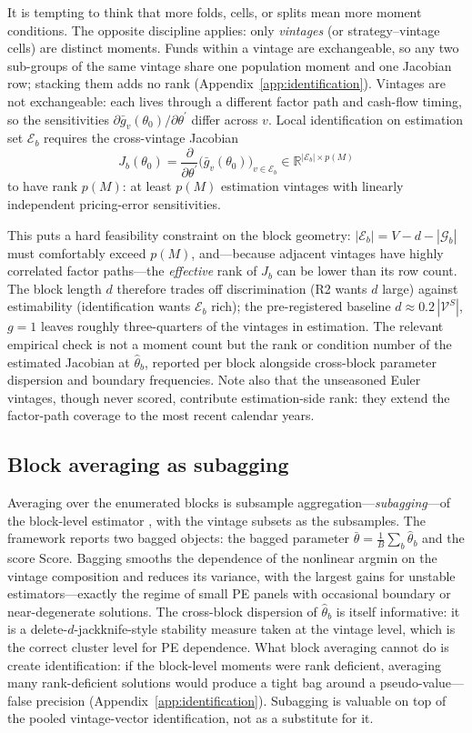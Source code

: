 \documentclass[11pt]{article}
\begin{document}
It is tempting to think that more folds, cells, or splits mean more moment conditions. The opposite discipline applies: only \emph{vintages} (or strategy--vintage cells) are distinct moments. Funds within a vintage are exchangeable, so any two sub-groups of the same vintage share one population moment and one Jacobian row; stacking them adds no rank (Appendix~\ref{app:identification}). Vintages are not exchangeable: each lives through a different factor path and cash-flow timing, so the sensitivities \(\partial\bar g_v(\theta_0)/\partial\theta^\prime\) differ across \(v\). Local identification on estimation set \(\mathcal E_b\) requires the cross-vintage Jacobian
\[
J_b(\theta_0)=\frac{\partial}{\partial\theta^\prime}\bigl(\bar g_{v}(\theta_0)\bigr)_{v\in\mathcal E_b}\in\mathbb R^{|\mathcal E_b|\times p(M)}
\]
to have rank \(p(M)\): at least \(p(M)\) estimation vintages with linearly independent pricing-error sensitivities.

This puts a hard feasibility constraint on the block geometry: \(|\mathcal E_b|=V-d-|\mathcal G_b|\) must comfortably exceed \(p(M)\), and---because adjacent vintages have highly correlated factor paths---the \emph{effective} rank of \(J_b\) can be lower than its row count. The block length \(d\) therefore trades off discrimination (R2 wants \(d\) large) against estimability (identification wants \(\mathcal E_b\) rich); the pre-registered baseline \(d\approx0.2\,|\mathcal V^S|\), \(g=1\) leaves roughly three-quarters of the vintages in estimation. The relevant empirical check is not a moment count but the rank or condition number of the estimated Jacobian at \(\hat\theta_b\), reported per block alongside cross-block parameter dispersion and boundary frequencies. Note also that the unseasoned Euler vintages, though never scored, contribute estimation-side rank: they extend the factor-path coverage to the most recent calendar years.

\subsection{Block averaging as subagging}
\label{sec:subagging}

Averaging over the enumerated blocks is subsample aggregation---\emph{subagging}---of the block-level estimator \citep{BuhlmannYu2002}, with the vintage subsets as the subsamples. The framework reports two bagged objects: the bagged parameter \(\bar\theta=\tfrac1B\sum_b\hat\theta_b\) and the score \(\mathrm{Score}\). Bagging smooths the dependence of the nonlinear argmin on the vintage composition and reduces its variance, with the largest gains for unstable estimators---exactly the regime of small PE panels with occasional boundary or near-degenerate solutions. The cross-block dispersion of \(\hat\theta_b\) is itself informative: it is a delete-\(d\)-jackknife-style stability measure taken at the vintage level, which is the correct cluster level for PE dependence. What block averaging cannot do is create identification: if the block-level moments were rank deficient, averaging many rank-deficient solutions would produce a tight bag around a pseudo-value---false precision (Appendix~\ref{app:identification}). Subagging is valuable on top of the pooled vintage-vector identification, not as a substitute for it.
\end{document}
